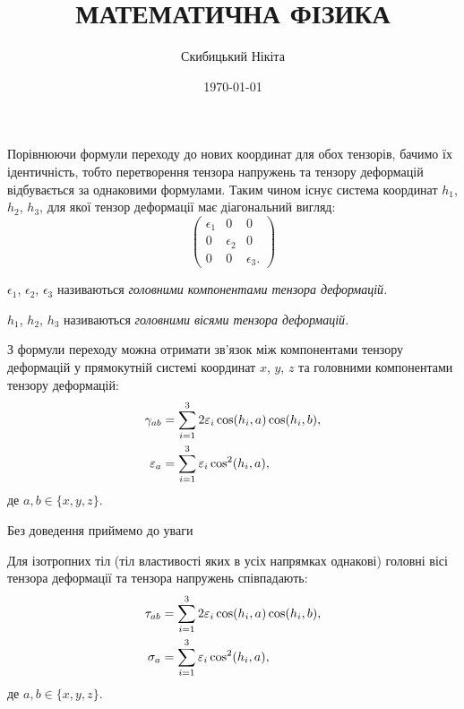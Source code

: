 

\title{{\Huge МАТЕМАТИЧНА ФІЗИКА}}
\author{Скибицький Нікіта}
\date{\today}





\tableofcontents

\setcounter{section}{3}
\setcounter{subsection}{2}
\setcounter{subsubsection}{5}
\setcounter{theorem}{22}
\setcounter{equation}{56}

Порівнюючи формули переходу до нових координат для обох тензорів, бачимо їх ідентичність, тобто перетворення тензора напружень та тензору деформацій відбувається за однаковими формулами. Таким чином існує система координат $h_1$, $h_2$, $h_3$, для якої тензор деформації має діагональний вигляд: 
\begin{equation}
	\begin{pmatrix}
		\epsilon_1 & 0 & 0 \\
		0 & \epsilon_2 & 0 \\
		0 & 0 & \epsilon_3.
	\end{pmatrix}
\end{equation}

\begin{definition}
 	$\epsilon_1$, $\epsilon_2$, $\epsilon_3$ називаються \it{головними компонентами} тензора деформацій.
\end{definition} 

\begin{definition}
	$h_1$, $h_2$, $h_3$ називаються \it{головними вісями} тензора деформацій.
\end{definition}

З формули переходу можна отримати зв'язок між компонентами тензору деформацій у прямокутній системі координат $x$, $y$, $z$ та головними компонентами тензору деформацій:
\begin{align}
	\gamma_{a b} &= \displaystyle\sum\limits_{i = 1}^3 2 \varepsilon_i \cos (h_i, a) \cos (h_i, b), \\
	\varepsilon_a &= \displaystyle\sum\limits_{i = 1}^3 \varepsilon_i \cos^2(h_i, a),
\end{align}
де $a, b \in \{x, y, z\}$. \medskip

Без доведення приймемо до уваги 

\begin{proposition}
	Для ізотропних тіл (тіл властивості яких в усіх напрямках однакові) головні вісі тензора деформації та тензора напружень співпадають:
	\begin{align}
		\tau_{a b} &= \displaystyle\sum\limits_{i = 1}^3 2 \varepsilon_i \cos (h_i, a) \cos (h_i, b), \\
		\sigma_a &= \displaystyle\sum\limits_{i = 1}^3 \varepsilon_i \cos^2(h_i, a),
	\end{align}
	де $a, b \in \{x, y, z\}$.
\end{proposition}

